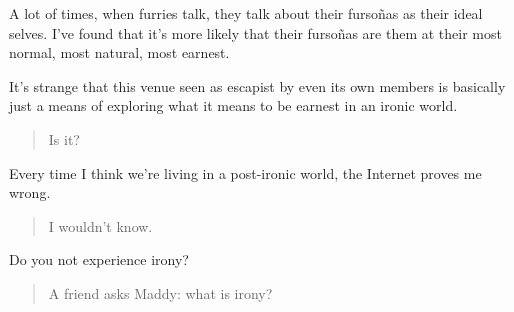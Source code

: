 A lot of times, when furries talk, they talk about their fursoñas as their ideal selves. I've found that it's more likely that their fursoñas are them at their most normal, most natural, most earnest.

It's strange that this venue seen as escapist by even its own members is basically just a means of exploring what it means to be earnest in an ironic world.

\begin{quote}
Is it?
\end{quote}

Every time I think we're living in a post-ironic world, the Internet proves me wrong.

\begin{quote}
I wouldn't know.
\end{quote}

Do you not experience irony?

\begin{quote}
A friend asks Maddy: what is irony?
\end{quote}
